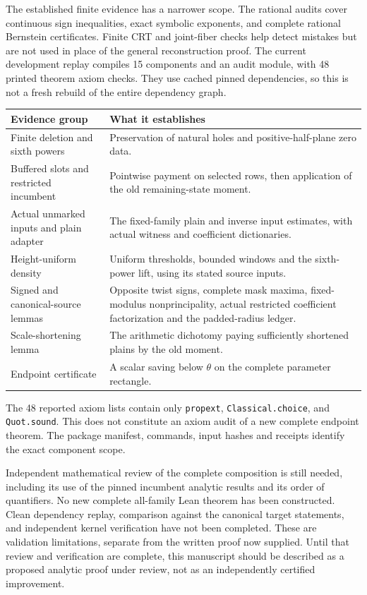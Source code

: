 \documentclass[11pt]{article}
\theoremstyle{definition}
\newcommand{\code}[1]{\texttt{\small #1}}
\begin{document}
The established finite evidence has a narrower scope. The rational audits
cover continuous sign inequalities, exact symbolic exponents, and complete
rational Bernstein certificates. Finite CRT and joint-fiber checks help
detect mistakes but are not used in place of the general reconstruction
proof. The current development replay compiles 15 components and an audit
module, with 48 printed theorem axiom checks. They use cached pinned
dependencies, so this is not a fresh rebuild of the entire dependency graph.

\begin{center}\small
\begin{tabularx}{\textwidth}{@{}>{\raggedright\arraybackslash}p{}X@{}}
\toprule
Evidence group & What it establishes\\
\midrule
Finite deletion and sixth powers & Preservation of natural holes and positive-half-plane zero data.\\
Buffered slots and restricted incumbent & Pointwise payment on selected rows, then application of the old remaining-state moment.\\
Actual unmarked inputs and plain adapter & The fixed-family plain and inverse input estimates, with actual witness and coefficient dictionaries.\\
Height-uniform density & Uniform thresholds, bounded windows and the sixth-power lift, using its stated source inputs.\\
Signed and canonical-source lemmas & Opposite twist signs, complete mask maxima, fixed-modulus nonprincipality, actual restricted coefficient factorization and the padded-radius ledger.\\
Scale-shortening lemma & The arithmetic dichotomy paying sufficiently shortened plains by the old moment.\\
Endpoint certificate & A scalar saving below $\theta$ on the complete parameter rectangle.\\
\bottomrule
\end{tabularx}
\end{center}
The 48 reported axiom lists contain only \code{propext},
\code{Classical.choice}, and \code{Quot.sound}. This does not constitute
an axiom audit of a new complete endpoint theorem. The package manifest,
commands, input hashes and receipts identify the exact component scope.

Independent mathematical review of the complete composition is still
needed, including its use of the pinned incumbent analytic results and
its order of quantifiers. No new complete all-family Lean theorem has
been constructed. Clean dependency replay, comparison against the
canonical target statements, and independent kernel verification have
not been completed. These are validation limitations, separate from
the written proof now supplied. Until that review and verification are
complete, this manuscript should be described as a proposed analytic
proof under review, not as an independently certified improvement.
\end{document}
